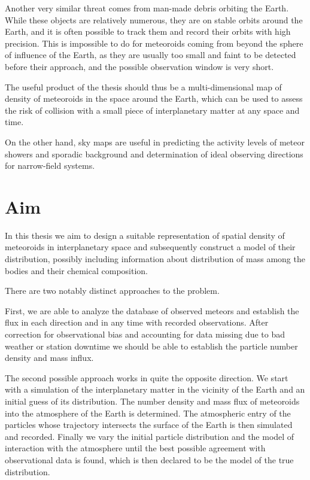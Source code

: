     Another very similar threat comes from man-made debris orbiting the Earth.
    While these objects are relatively numerous, they are on stable orbits around
    the Earth, and it is often possible to track them and record their orbits with high precision.
    This is impossible to do for meteoroids coming from beyond the sphere of influence of the Earth,
    as they are usually too small and faint to be detected before their approach, and the possible
    observation window is very short.

    The useful product of the thesis should thus be a multi-dimensional map of density
    of meteoroids in the space around the Earth, which can be used to assess the risk
    of collision with a small piece of interplanetary matter at any space and time.

    On the other hand, sky maps are useful in predicting the activity levels of
    meteor showers and sporadic background and determination of ideal observing
    directions for narrow-field systems.


\section{Aim}
    In this thesis we aim to design a suitable representation of spatial density of meteoroids
    in interplanetary space and subsequently construct a model of their distribution,
    possibly including information about distribution of mass among the bodies and their chemical composition.

    There are two notably distinct approaches to the problem.

    First, we are able to analyze the database of observed meteors and establish
    the flux in each direction and in any time with recorded observations.
    After correction for observational bias and accounting for data missing due
    to bad weather or station downtime we should be able to establish the particle
    number density and mass influx.

    The second possible approach works in quite the opposite direction. We start with a simulation
    of the interplanetary matter in the vicinity of the Earth and an initial guess of its distribution.
    The number density and mass flux of meteoroids into the atmosphere of the Earth is determined.
    The atmospheric entry of the particles whose trajectory intersects the surface of the Earth
    is then simulated and recorded.
    Finally we vary the initial particle distribution and the model of interaction with the atmosphere
    until the best possible agreement with observational data is found, which is then
    declared to be the model of the true distribution.

